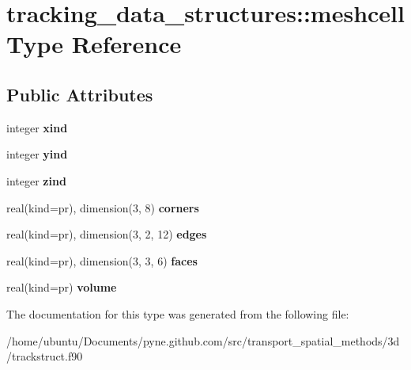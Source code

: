 \hypertarget{structtracking__data__structures_1_1meshcell}{}\section{tracking\+\_\+data\+\_\+structures\+:\+:meshcell Type Reference}
\label{structtracking__data__structures_1_1meshcell}
\subsection*{Public Attributes}
\begin{DoxyCompactItemize}
\item 
integer {\bfseries xind}\hypertarget{structtracking__data__structures_1_1meshcell_afd4a41c0924cdfa672043dff98383247}{}\label{structtracking__data__structures_1_1meshcell_afd4a41c0924cdfa672043dff98383247}

\item 
integer {\bfseries yind}\hypertarget{structtracking__data__structures_1_1meshcell_aaf221593bf60310472dfdcc78d6c2e79}{}\label{structtracking__data__structures_1_1meshcell_aaf221593bf60310472dfdcc78d6c2e79}

\item 
integer {\bfseries zind}\hypertarget{structtracking__data__structures_1_1meshcell_ae19a4af32e3f12bfa8042da05505aa6e}{}\label{structtracking__data__structures_1_1meshcell_ae19a4af32e3f12bfa8042da05505aa6e}

\item 
real(kind=pr), dimension(3, 8) {\bfseries corners}\hypertarget{structtracking__data__structures_1_1meshcell_a13fcf4021ce5a5d1579ffbff38aaf33d}{}\label{structtracking__data__structures_1_1meshcell_a13fcf4021ce5a5d1579ffbff38aaf33d}

\item 
real(kind=pr), dimension(3, 2, 12) {\bfseries edges}\hypertarget{structtracking__data__structures_1_1meshcell_a4edd8593d1bb0badbc5d723780d2c6c5}{}\label{structtracking__data__structures_1_1meshcell_a4edd8593d1bb0badbc5d723780d2c6c5}

\item 
real(kind=pr), dimension(3, 3, 6) {\bfseries faces}\hypertarget{structtracking__data__structures_1_1meshcell_a8b0a596007ab35b13961d9037d7b6e44}{}\label{structtracking__data__structures_1_1meshcell_a8b0a596007ab35b13961d9037d7b6e44}

\item 
real(kind=pr) {\bfseries volume}\hypertarget{structtracking__data__structures_1_1meshcell_a1a08090e934eae80b9b27f55c4ccaa00}{}\label{structtracking__data__structures_1_1meshcell_a1a08090e934eae80b9b27f55c4ccaa00}

\end{DoxyCompactItemize}


The documentation for this type was generated from the following file\+:\begin{DoxyCompactItemize}
\item 
/home/ubuntu/\+Documents/pyne.\+github.\+com/src/transport\+\_\+spatial\+\_\+methods/3d/trackstruct.\+f90\end{DoxyCompactItemize}

